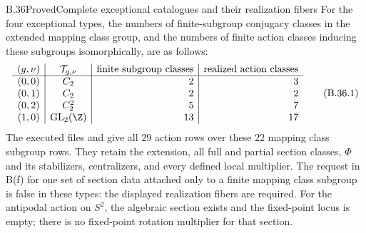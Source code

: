 \begin{claim}{B.36}{Proved}{Complete exceptional catalogues and their realization fibers}
For the four exceptional types, the numbers of finite-subgroup
conjugacy classes in the extended mapping class group, and the
numbers of finite action classes inducing these subgroups
isomorphically, are as follows:
\[
\begin{array}{c|c|r|r}
(g,\nu)&\mathcal T_{g,\nu}&
 \text{finite subgroup classes}&\text{realized action classes}\\\hline
(0,0)&C_2&2&3\\
(0,1)&C_2&2&2\\
(0,2)&C_2^2&5&7\\
(1,0)&\mathrm{GL}_2(\Z)&13&17
\end{array}                                             \tag{B.36.1}
\]
The executed files
 and
 give all $29$ action rows over
these $22$ mapping class subgroup rows.  They retain the extension,
all full and partial section classes, $\Phi$ and its stabilizers,
centralizers, and every defined local multiplier.
The request in B(f) for one set of section data attached only to a
finite mapping class subgroup is false in these types: the displayed
realization fibers are required.  For the antipodal action on $S^2$,
the algebraic section exists and the fixed-point locus is empty;
there is no fixed-point rotation multiplier for that section.
\end{claim}
